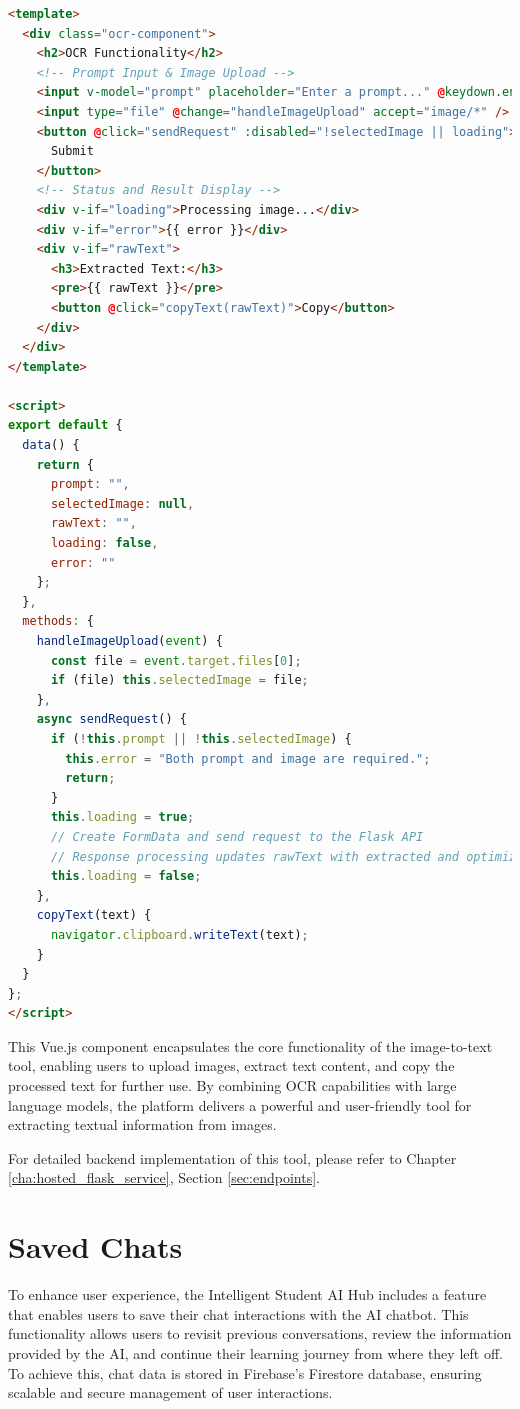 \begin{lstlisting}[language=html, caption={Abbreviated Vue.js Component for Image-to-Text Conversion}, frame=single]
<template>
  <div class="ocr-component">
    <h2>OCR Functionality</h2>
    <!-- Prompt Input & Image Upload -->
    <input v-model="prompt" placeholder="Enter a prompt..." @keydown.enter="sendRequest" />
    <input type="file" @change="handleImageUpload" accept="image/*" />
    <button @click="sendRequest" :disabled="!selectedImage || loading">
      Submit
    </button>
    <!-- Status and Result Display -->
    <div v-if="loading">Processing image...</div>
    <div v-if="error">{{ error }}</div>
    <div v-if="rawText">
      <h3>Extracted Text:</h3>
      <pre>{{ rawText }}</pre>
      <button @click="copyText(rawText)">Copy</button>
    </div>
  </div>
</template>

<script>
export default {
  data() {
    return {
      prompt: "",
      selectedImage: null,
      rawText: "",
      loading: false,
      error: ""
    };
  },
  methods: {
    handleImageUpload(event) {
      const file = event.target.files[0];
      if (file) this.selectedImage = file;
    },
    async sendRequest() {
      if (!this.prompt || !this.selectedImage) {
        this.error = "Both prompt and image are required.";
        return;
      }
      this.loading = true;
      // Create FormData and send request to the Flask API
      // Response processing updates rawText with extracted and optimized text
      this.loading = false;
    },
    copyText(text) {
      navigator.clipboard.writeText(text);
    }
  }
};
</script>
\end{lstlisting}

This Vue.js component encapsulates the core functionality of the image-to-text tool, enabling users to upload images, extract text content, 
and copy the processed text for further use. By combining OCR capabilities with large language models, 
the platform delivers a powerful and user-friendly tool for extracting textual information from images.

For detailed backend implementation of this tool, please refer to Chapter \ref{cha:hosted_flask_service}, Section \ref{sec:endpoints}.


\section{Saved Chats}

To enhance user experience, the Intelligent Student AI Hub includes a feature that enables users to save their chat interactions with the AI chatbot. This functionality allows users to revisit previous conversations, review the information provided by the AI, and continue their learning journey from where they left off. To achieve this, chat data is stored in Firebase’s Firestore database, ensuring scalable and secure management of user interactions.

